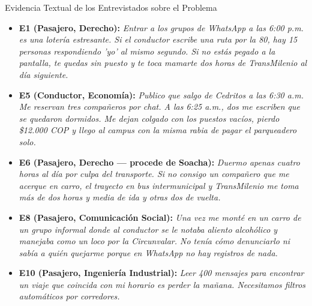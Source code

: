 \documentclass[11pt,a4paper]{article}
\begin{document}
\begin{evidencebox}{Evidencia Textual de los Entrevistados sobre el Problema}
\begin{itemize}[leftmargin=*]
    \item \textbf{E1 (Pasajero, Derecho):} \textit{\guillemotleft Entrar a los grupos de WhatsApp a las 6:00 p.m. es una loter\'ia estresante. Si el conductor escribe una ruta por la 80, hay 15 personas respondiendo 'yo' al mismo segundo. Si no est\'as pegado a la pantalla, te quedas sin puesto y te toca mamarte dos horas de TransMilenio al d\'ia siguiente.\guillemotright}
    \item \textbf{E5 (Conductor, Econom\'ia):} \textit{\guillemotleft Publico que salgo de Cedritos a las 6:30 a.m. Me reservan tres compa\~neros por chat. A las 6:25 a.m., dos me escriben que se quedaron dormidos. Me dejan colgado con los puestos vac\'ios, pierdo \$12.000 COP y llego al campus con la misma rabia de pagar el parqueadero solo.\guillemotright}
    \item \textbf{E6 (Pasajero, Derecho --- procede de Soacha):} \textit{\guillemotleft Duermo apenas cuatro horas al d\'ia por culpa del transporte. Si no consigo un compa\~nero que me acerque en carro, el trayecto en bus intermunicipal y TransMilenio me toma m\'as de dos horas y media de ida y otras dos de vuelta.\guillemotright}
    \item \textbf{E8 (Pasajero, Comunicaci\'on Social):} \textit{\guillemotleft Una vez me mont\'e en un carro de un grupo informal donde al conductor se le notaba aliento alcoh\'olico y manejaba como un loco por la Circunvalar. No ten\'ia c\'omo denunciarlo ni sab\'ia a qui\'en quejarme porque en WhatsApp no hay registros de nada.\guillemotright}
    \item \textbf{E10 (Pasajero, Ingenier\'ia Industrial):} \textit{\guillemotleft Leer 400 mensajes para encontrar un viaje que coincida con mi horario es perder la ma\~nana. Necesitamos filtros autom\'aticos por corredores.\guillemotright}
\end{itemize}
\end{evidencebox}
\end{document}
